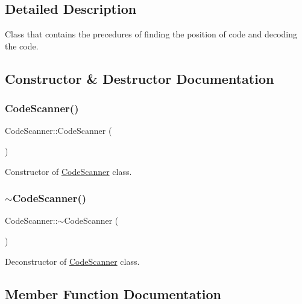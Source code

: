 \subsection{Detailed Description}
Class that contains the precedures of finding the position of code and decoding the code. 

\subsection{Constructor \& Destructor Documentation}
\mbox{\label{class_code_scanner_a3bcd2d58ba99d3489a82c39a7982d13b}} 
\subsubsection{\texorpdfstring{Code\+Scanner()}{CodeScanner()}}
{\footnotesize\ttfamily Code\+Scanner\+::\+Code\+Scanner (\begin{DoxyParamCaption}{ }\end{DoxyParamCaption})\hspace{0.3cm}{\ttfamily [inline]}}



Constructor of \hyperlink{class_code_scanner}{Code\+Scanner} class. 

\mbox{\label{class_code_scanner_a092360e7816a81de90384495bd0f3e44}} 
\subsubsection{\texorpdfstring{$\sim$\+Code\+Scanner()}{~CodeScanner()}}
{\footnotesize\ttfamily Code\+Scanner\+::$\sim$\+Code\+Scanner (\begin{DoxyParamCaption}{ }\end{DoxyParamCaption})\hspace{0.3cm}{\ttfamily [inline]}}



Deconstructor of \hyperlink{class_code_scanner}{Code\+Scanner} class. 



\subsection{Member Function Documentation}
\mbox{\label{class_code_scanner_a9660d74f2750b274d92396be1cd63ab4}} 
